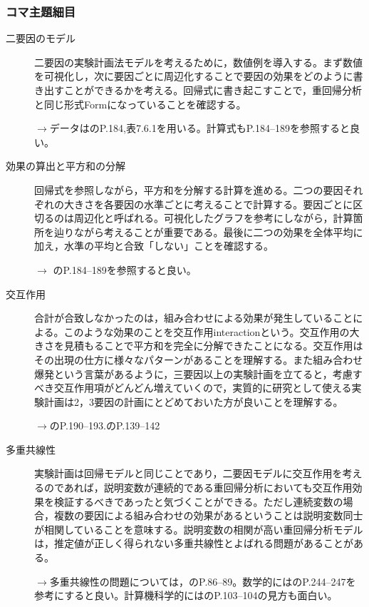 \subsubsection{コマ主題細目}
\begin{description}
\item[二要因のモデル]二要因の実験計画法モデルを考えるために，数値例を導入する。まず数値を可視化し，次に要因ごとに周辺化することで要因の効果をどのように書き出すことができるかを考える。回帰式に書き起こすことで，重回帰分析と同じ形式Formになっていることを確認する。
\begin{flushright}
    $\to$データは\citet{Yamada2004}のP.184,表7.6.1を用いる。計算式もP.184--189を参照すると良い。
\end{flushright}

\item[効果の算出と平方和の分解]回帰式を参照しながら，平方和を分解する計算を進める。二つの要因それぞれの大きさを各要因の水準ごとに考えることで計算する。要因ごとに区切るのは周辺化と呼ばれる。可視化したグラフを参考にしながら，計算箇所を辿りながら考えることが重要である。最後に二つの効果を全体平均に加え，水準の平均と合致「しない」ことを確認する。
\begin{flushright}
    $\to$ \citet{Yamada2004}のP.184--189を参照すると良い。
\end{flushright}

\item[交互作用]合計が合致しなかったのは，組み合わせによる効果が発生していることによる。このような効果のことを交互作用interactionという。交互作用の大きさを見積もることで平方和を完全に分解できたことになる。交互作用はその出現の仕方に様々なパターンがあることを理解する。また組み合わせ爆発という言葉があるように，三要因以上の実験計画を立てると，考慮すべき交互作用項がどんどん増えていくので，実質的に研究として使える実験計画は2，3要因の計画にとどめておいた方が良いことを理解する。
\begin{flushright}
    $\to$\citet{Yamada2004}のP.190--193.\citet{kosugi2019}のP.139--142
\end{flushright}

\item[多重共線性]実験計画は回帰モデルと同じことであり，二要因モデルに交互作用を考えるのであれば，説明変数が連続的である重回帰分析においても交互作用効果を検証するべきであったと気づくことができる。ただし連続変数の場合，複数の要因による組み合わせの効果があるということは説明変数同士が相関していることを意味する。説明変数の相関が高い重回帰分析モデルは，推定値が正しく得られない多重共線性とよばれる問題があることがある。
\begin{flushright}
    $\to$多重共線性の問題については，\citet{清水201705}のP.86--89。数学的には\citet{南風原200206}のP.244--247を参考にすると良い。計算機科学的には\citet{松浦201610}のP.103--104の見方も面白い。
\end{flushright}


\end{description}
